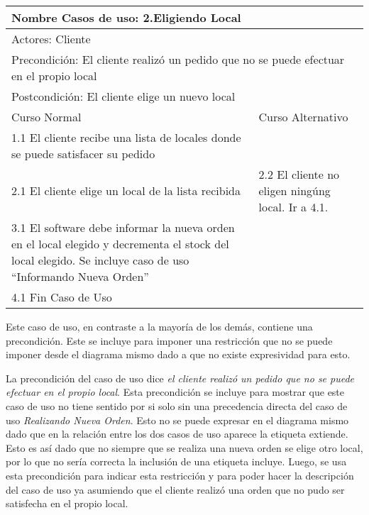 \documentclass[a4paper,10pt]{article}
\begin{document}
\begin{center}
\begin{tabularx}{14cm}{|X|X|}
\hline
\multicolumn{2}{|l|}{Nombre Casos de uso: 2.Eligiendo Local}\\
\hline
\multicolumn{2}{|l|}{Actores: Cliente}\\
\hline
\multicolumn{2}{|l|}{Precondici\'on: El cliente realiz\'o un pedido que no se puede efectuar en el propio local}\\
\hline
\multicolumn{2}{|l|}{Postcondici\'on: El cliente elige un nuevo local}\\
\hline
Curso Normal & Curso Alternativo\\
\hline
1.1 El cliente recibe una lista de locales donde se puede satisfacer su pedido & 
\\
\hline
2.1 El cliente elige un local de la lista recibida & 2.2 El cliente no eligen ning\'ung local. Ir a 4.1.
\\
\hline
3.1 El software debe informar la nueva orden en el local elegido y decrementa el stock del local elegido. Se incluye caso de uso ``Informando Nueva Orden'' &
\\
\hline
4.1 Fin Caso de Uso &
\\
\hline
\end{tabularx}
\end{center}

Este caso de uso, en contraste a la mayor\'ia de los dem\'as, contiene una precondici\'on. Este se incluye para imponer una restricci\'on que no
se puede imponer desde el diagrama mismo dado a que no existe expresividad para esto. 

La precondici\'on del caso de uso dice \emph{el cliente realiz\'o un pedido que no se puede efectuar en el propio local}.
Esta precondici\'on se incluye para mostrar que este caso de uso no tiene sentido por si solo sin una precedencia directa del caso de uso
\emph{Realizando Nueva Orden}. Esto no se puede expresar en el diagrama mismo dado que  en la relaci\'on entre los dos casos de uso 
aparece la etiqueta extiende. Esto es as\'i dado que no siempre que se realiza una nueva orden se elige otro local, por lo que no ser\'ia correcta
la inclusi\'on de una etiqueta incluye. Luego, se usa esta precondici\'on para indicar esta restricci\'on y para poder hacer la descripci\'on del caso de uso
ya asumiendo que el cliente realiz\'o una orden que no pudo ser satisfecha en el propio local.

\bigskip
\end{document}
